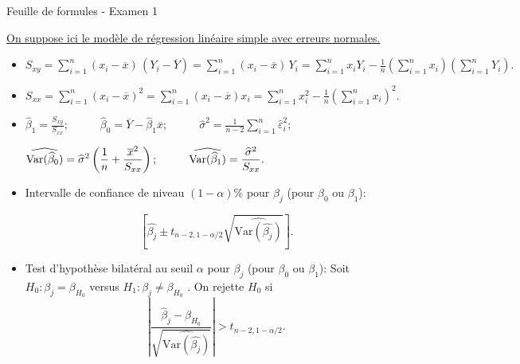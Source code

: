 \documentclass[a4paper, 11pt]{article}
\begin{document}
\begin{center}
{\Large Feuille de formules - Examen 1}
\end{center}


\underline{On suppose ici le modèle de régression linéaire simple avec erreurs normales.}

\begin{itemize}

\item[$\bullet$]

$ \displaystyle
S_{xy}=\sum_{i=1}^n (x_i-\overline x)\,(Y_i-\overline{Y}) = \sum_{i=1}^n (x_i-\overline x)\,Y_i=\sum_{i=1}^nx_iY_i-\frac{1}{n}\left(\sum_{i=1}^n x_i\right)\left(\sum_{i=1}^n Y_i\right).
$

\item[$\bullet$]
$\displaystyle S_{xx}=\sum_{i=1}^n(x_i-\overline x)^2=\sum_{i=1}^n(x_i-\overline x)x_i=\sum_{i=1}^nx_i^2-\frac{1}{n}\left(\sum_{i=1}^n x_i\right)^2.$

\item[$\bullet$]

$ \displaystyle
\widehat{\beta}_1 = \frac{S_{xy}}{S_{xx}}; \; \; \; \; \; \; \; \; \; \;
 \widehat{\beta}_0 = \overline{Y} - \widehat{\beta}_1\overline{x}; 
 \; \; \; \; \; \; \; \; \; \;
  \widehat{\sigma}^2 = \frac{1}{n-2}\sum_{i=1}^n \widehat{\varepsilon}_i^2;
 $


$ \displaystyle \widehat{\mbox{Var}(\widehat{\beta}_0)} = \widehat{\sigma}^2 \left( {1\over n}+{\overline{x}^2\over S_{xx}} \right);   
\; \; \; \; \; \; \; \; \; \; \widehat{\mbox{Var}(\widehat{\beta}_1)} = \frac{\widehat{\sigma}^2}{S_{xx}}. $


\item[$\bullet$] Intervalle de confiance de niveau $(1-\alpha)\%$ pour $\beta_j$ (pour $\beta_0$ ou $\beta_1$):


$$\left[\widehat{\beta_j} \pm t_{n-2, 1-\alpha/2} \sqrt{\widehat{\mbox{Var}(\widehat{\beta_j})}} \right]. $$

\item[$\bullet$]
Test d'hypothèse bilatéral au seuil $\alpha$ pour $\beta_j$ (pour $\beta_0$ ou $\beta_1$): Soit $H_0 : \beta_j = \beta_{H_0}$ versus $H_1 : \beta_j \neq \beta_{H_0}$ . 
On rejette $H_0$ si $$ \left| \frac{\widehat{\beta}_j - \beta_{H_0} }{\sqrt{\widehat{\mbox{Var}(\widehat{\beta_j})}}} \right| > t_{n-2, 1- \alpha/2}.$$


\end{itemize}
\end{document}
